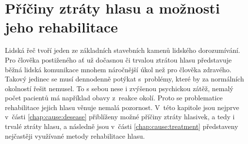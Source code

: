 \chapter{Příčiny ztráty hlasu a možnosti jeho rehabilitace}
\label{chap:cause}

Lidská řeč tvoří jeden ze základních stavebních kamenů lidského dorozumívání. Pro člověka
postiženého ať už dočasnou či trvalou ztrátou hlasu představuje běžná lidská
komunikace mnohem náročnější úkol než pro člověka zdravého. Takový jedinec se
musí dennodenně potýkat s~problémy, které by za normálních okolností řešit
nemusel. To s sebou nese %
i zvýšenou psychickou zátěž, nemalý počet pacientů má například obavy %
z~reakce okolí. Proto se problematice rehabilitace jejich
hlasu věnuje nemalá pozornost. V~této kapitole jsou nejprve v~části
\ref{chap:cause:desease} přiblíženy možné příčiny ztráty hlasivek, a tedy i
trvalé ztráty hlasu, a následně jsou v~části \ref{chap:cause:treatment} představeny
nejčastěji využívané metody rehabilitace hlasu.



% 
% 
